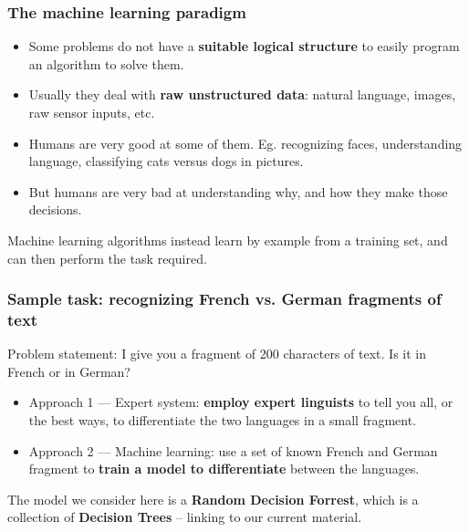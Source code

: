 \documentclass{beamer} %
\newcommand\emc[1]{\textcolor{brightblue}{\textbf{#1}}}
\begin{document}
\begin{frame}

\frametitle{The machine learning paradigm}

\begin{itemize}
  \item Some problems do not have a \emc{suitable logical structure} to easily program an algorithm to solve them.
  \item Usually they deal with \emc{raw unstructured data}: natural language, images, raw sensor inputs, etc. 
  \item Humans are very good at some of them. Eg. recognizing faces, understanding language, classifying cats versus dogs in pictures.
  \item But humans are very bad at understanding why, and how they make those decisions.
\end{itemize}

\vspace{3mm}
Machine learning algorithms instead learn by example from a training set, and can then perform the task required.

\end{frame}

\begin{frame}

\frametitle{Sample task: recognizing French vs. German fragments of text}

Problem statement: I give you a fragment of 200 characters of text. Is it in French or in German?

\begin{itemize}
  \item Approach 1 --- Expert system: \emc{employ expert linguists} to tell you all, or the best ways, to differentiate the two languages in a small fragment.
  \item Approach 2 --- Machine learning: use a set of known French and German fragment to \emc{train a model to differentiate} between the languages.
\end{itemize}

\vspace{3mm}
The model we consider here is a \emc{Random Decision Forrest}, which is a collection of \emc{Decision Trees} -- linking to our current material.

\end{frame}
\end{document}
